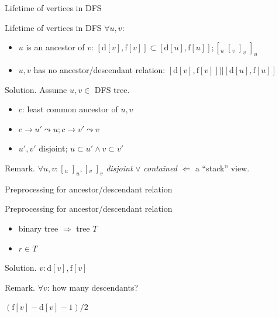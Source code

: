 \begin{frame}{Lifetime of vertices in DFS}
  \begin{exampleblock}{Lifetime of vertices in DFS } 
    $\forall u,v$:
    \begin{itemize}
      \item $u$ is an ancestor of $v$: $[\text{d}[v], \text{f}[v]] \subset [\text{d}[u], \text{f}[u]]; [_{u}\; [_{v}\; ]_{v}\; ]_{u}$
      \item $u,v$ has no ancestor/descendant relation: $[\text{d}[v], \text{f}[v]] || [\text{d}[u], \text{f}[u]]$
    \end{itemize}
  \end{exampleblock}

  \begin{block}{Solution.}
    Assume $u, v \in $ DFS tree.

    \begin{itemize}
      \item $c$: least common ancestor of $u,v$ 
      \item $c \to u' \leadsto u; c \to v' \leadsto v$
      \item $u', v'$ disjoint; $u \subset u' \land v \subset v'$
    \end{itemize}
  \end{block}

  \begin{alertblock}{Remark.}
    $\forall u,v: [_{u} \; ]_{u}, [_{v} \; ]_{v}$ \emph{disjoint} $\lor$ \emph{contained} $\Leftarrow$ a ``stack'' view.
  \end{alertblock}
\end{frame}
\begin{frame}{Preprocessing for ancestor/descendant relation}
  \begin{exampleblock}{Preprocessing for ancestor/descendant relation }
    \begin{itemize}
      \item binary tree $\Rightarrow$ tree $T$
      \item $r \in T$
    \end{itemize}
  \end{exampleblock}

  \begin{block}{Solution.}
    $v: \text{d}[v], \text{f}[v]$
  \end{block}

  \begin{alertblock}{Remark.}
    $\forall v$: how many descendants?

    $(\text{f}[v] - \text{d}[v] - 1) / 2$
  \end{alertblock}
\end{frame}
